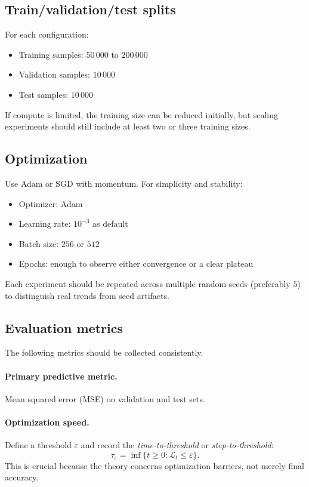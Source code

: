 \documentclass[11pt]{article}
\begin{document}
\subsection{Train/validation/test splits}

For each configuration:
\begin{itemize}[leftmargin=2em]
    \item Training samples: $50\,000$ to $200\,000$
    \item Validation samples: $10\,000$
    \item Test samples: $10\,000$
\end{itemize}
If compute is limited, the training size can be reduced initially, but scaling experiments should still include at least two or three training sizes.

\subsection{Optimization}

Use Adam or SGD with momentum. For simplicity and stability:
\begin{itemize}[leftmargin=2em]
    \item Optimizer: Adam
    \item Learning rate: $10^{-3}$ as default
    \item Batch size: $256$ or $512$
    \item Epochs: enough to observe either convergence or a clear plateau
\end{itemize}

Each experiment should be repeated across multiple random seeds (preferably $5$) to distinguish real trends from seed artifacts.

\subsection{Evaluation metrics}

The following metrics should be collected consistently.

\paragraph{Primary predictive metric.}
Mean squared error (MSE) on validation and test sets.

\paragraph{Optimization speed.}
Define a threshold $\varepsilon$ and record the \emph{time-to-threshold} or \emph{step-to-threshold}:
\begin{equation}
    \tau_\varepsilon = \inf \{t \ge 0 : \mathcal{L}_t \le \varepsilon\}.
\end{equation}
This is crucial because the theory concerns optimization barriers, not merely final accuracy.
\end{document}
